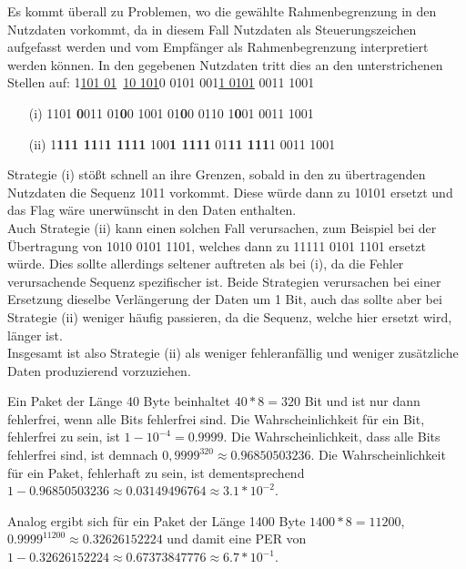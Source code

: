 \documentclass{../exercisesheet}
\begin{document}
\begin{exercise}{3}
	\begin{subexercise}
	Es kommt überall zu Problemen, wo die gewählte Rahmenbegrenzung in den Nutzdaten vorkommt, da in diesem Fall Nutzdaten als Steuerungszeichen aufgefasst werden und vom Empfänger als Rahmenbegrenzung interpretiert werden können. In den gegebenen Nutzdaten tritt dies an den unterstrichenen Stellen auf:
		1\underline{101 01}\ \underline{10 101}0 0101 001\underline{1 0101} 0011 1001
	\end{subexercise}

	\begin{subexercise}
	\begin{itemize}
	\item[(i)] 1101 \textbf{0}011 01\textbf{0}0 1001 01\textbf{0}0 0110 1\textbf{0}01 0011 1001
	\item[(ii)] 1\textbf{111 11}1\textbf{1 1111} 100\textbf{1 1111} 01\textbf{11 111}1 0011 1001
	\end{itemize}
	\end{subexercise}

	\begin{subexercise} 
		Strategie (i) stößt schnell an ihre Grenzen, sobald in den zu übertragenden Nutzdaten die Sequenz 1011 vorkommt. Diese würde dann zu 10101 ersetzt und das Flag wäre unerwünscht in den Daten enthalten.\\
		
		Auch Strategie (ii) kann einen solchen Fall verursachen, zum Beispiel bei der Übertragung von 1010 0101 1101, welches dann zu 11111 0101 1101 ersetzt würde. Dies sollte allerdings seltener auftreten als bei (i), da die Fehler verursachende Sequenz spezifischer ist. Beide Strategien verursachen bei einer Ersetzung dieselbe Verlängerung der Daten um 1 Bit, auch das sollte aber bei Strategie (ii) weniger häufig passieren, da die Sequenz, welche hier ersetzt wird, länger ist.\\
		
		Insgesamt ist also Strategie (ii) als weniger fehleranfällig und weniger zusätzliche Daten produzierend vorzuziehen.
	\end{subexercise}
\end{exercise}

\begin{exercise}{1}
	Ein Paket der Länge 40 Byte beinhaltet $40*8=320$ Bit und ist nur dann fehlerfrei, wenn alle Bits fehlerfrei sind. Die Wahrscheinlichkeit für ein Bit, fehlerfrei zu sein, ist $1-10^{-4}=0.9999$. Die Wahrscheinlichkeit, dass alle Bits fehlerfrei sind, ist demnach $0,9999^{320}\approx 0.96850503236$. Die Wahrscheinlichkeit für ein Paket, fehlerhaft zu sein, ist dementsprechend $1-0.96850503236\approx 0.03149496764\approx 3.1*10^{-2}$.
	
	Analog ergibt sich für ein Paket der Länge 1400 Byte $1400*8=11200$, $0.9999^{11200}\approx 0.32626152224$ und damit eine PER von $1-0.32626152224\approx 0.67373847776\approx
6.7*10^{-1}$.\end{exercise}
\end{document}

